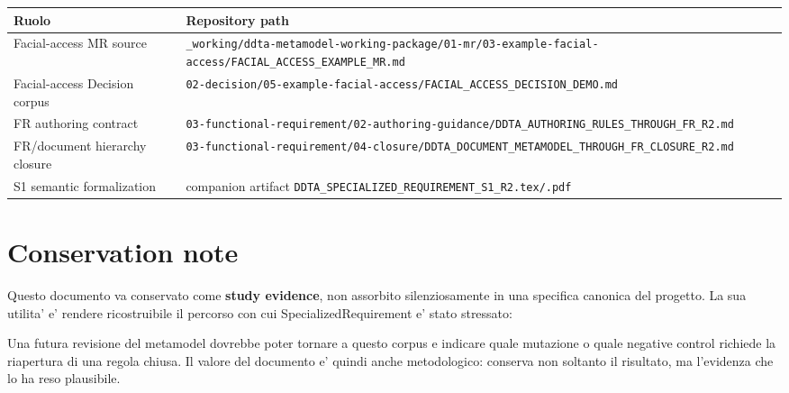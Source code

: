 \documentclass[11pt,a4paper]{article}
\newcommand{\MR}{\mathsf{MR}}
\begin{document}
\begin{longtable}{p{}p{}}
\toprule
\textbf{Ruolo} & \textbf{Repository path} \\
\midrule
\endhead
Facial-access MR source & \small\nolinkurl{_working/ddta-metamodel-working-package/01-mr/03-example-facial-access/FACIAL_ACCESS_EXAMPLE_MR.md} \\
Facial-access Decision corpus & \small\nolinkurl{02-decision/05-example-facial-access/FACIAL_ACCESS_DECISION_DEMO.md} \\
FR authoring contract & \small\nolinkurl{03-functional-requirement/02-authoring-guidance/DDTA_AUTHORING_RULES_THROUGH_FR_R2.md} \\
FR/document hierarchy closure & \small\nolinkurl{03-functional-requirement/04-closure/DDTA_DOCUMENT_METAMODEL_THROUGH_FR_CLOSURE_R2.md} \\
S1 semantic formalization & companion artifact \small\nolinkurl{DDTA_SPECIALIZED_REQUIREMENT_S1_R2.tex/.pdf} \\
\bottomrule
\end{longtable}

\section{Conservation note}

Questo documento va conservato come \textbf{study evidence}, non assorbito silenziosamente in una specifica canonica del progetto. La sua utilita' e' rendere ricostruibile il percorso con cui SpecializedRequirement e' stato stressato:

\begin{center}
\end{center}

Una futura revisione del metamodel dovrebbe poter tornare a questo corpus e indicare quale mutazione o quale negative control richiede la riapertura di una regola chiusa. Il valore del documento e' quindi anche metodologico: conserva non soltanto il risultato, ma l'evidenza che lo ha reso plausibile.
\end{document}
